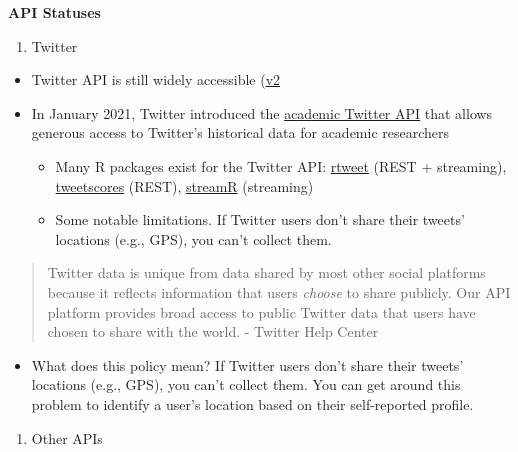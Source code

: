 \documentclass[
]{book}
\providecommand{\tightlist}{%
  \setlength{\itemsep}{0pt}\setlength{\parskip}{0pt}}
\begin{document}
\textbf{API Statuses}

\begin{enumerate}
\def\labelenumi{\arabic{enumi}.}
\tightlist
\item
  Twitter
\end{enumerate}

\begin{itemize}
\item
  Twitter API is still widely accessible (\href{https://developer.twitter.com/en/docs/twitter-api/early-access}{v2}
\item
  In January 2021, Twitter introduced the \href{https://developer.twitter.com/en/solutions/academic-research}{academic Twitter API} that allows generous access to Twitter's historical data for academic researchers

  \begin{itemize}
  \item
    Many R packages exist for the Twitter API: \href{https://cran.r-project.org/web/packages/rtweet/rtweet.pdf}{rtweet} (REST + streaming), \href{https://github.com/pablobarbera/twitter_ideology/tree/master/pkg/tweetscores}{tweetscores} (REST), \href{https://github.com/pablobarbera/streamR}{streamR} (streaming)
  \item
    Some notable limitations. If Twitter users don't share their tweets' locations (e.g., GPS), you can't collect them.
  \end{itemize}
\end{itemize}

\begin{quote}
Twitter data is unique from data shared by most other social platforms because it reflects information that users \emph{choose} to share publicly. Our API platform provides broad access to public Twitter data that users have chosen to share with the world. - Twitter Help Center
\end{quote}

\begin{itemize}
\tightlist
\item
  What does this policy mean? If Twitter users don't share their tweets' locations (e.g., GPS), you can't collect them. You can get around this problem to identify a user's location based on their self-reported profile.
\end{itemize}

\begin{enumerate}
\def\labelenumi{\arabic{enumi}.}
\setcounter{enumi}{1}
\tightlist
\item
  Other APIs
\end{enumerate}
\end{document}
